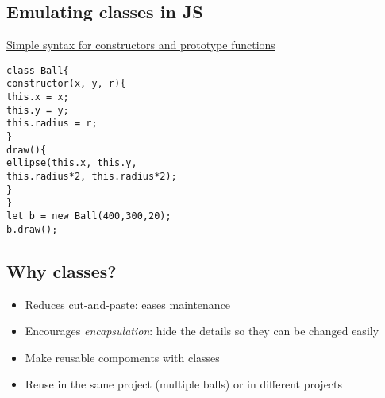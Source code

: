 \documentclass{article}[18pt]
\providecommand{\tightlist}{%
	\setlength{\itemsep}{0pt}\setlength{\parskip}{0pt}}
\begin{document}
\hypertarget{emulating-classes-in-js}{%
	\subsection{Emulating classes in JS}\label{emulating-classes-in-js}}

\href{https://developer.mozilla.org/en-US/docs/Web/JavaScript/Reference/Classes}{Simple
	syntax for constructors and prototype functions}

\begin{verbatim}
class Ball{
constructor(x, y, r){
this.x = x;
this.y = y;
this.radius = r;
}
draw(){
ellipse(this.x, this.y,
this.radius*2, this.radius*2);
}
}
let b = new Ball(400,300,20);
b.draw();
\end{verbatim}

\hypertarget{why-classes}{%
	\subsection{Why classes?}\label{why-classes}}

\begin{itemize}
	\tightlist
	\item
	Reduces cut-and-paste: eases maintenance
	\item
	Encourages \emph{encapsulation}: hide the details so they can be
	changed easily
	\item
	Make reusable compoments with classes
	\item
	Reuse in the same project (multiple balls) or in different projects
\end{itemize}
\end{document}
